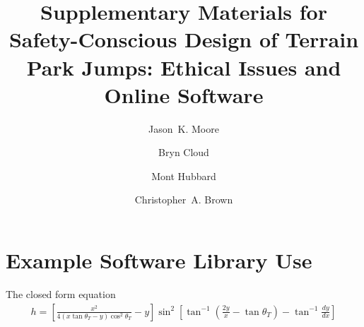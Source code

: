 \documentclass[]{article}
\begin{document}
\title{Supplementary Materials for Safety-Conscious Design of Terrain Park
Jumps: Ethical Issues and Online Software}

\author{
  Jason~K. Moore \and
  Bryn Cloud \and
  Mont Hubbard \and
  Christopher~A. Brown
}

\maketitle

\section{Example Software Library Use}
\label{sec:example}
%
The closed form equation
%
\begin{align}
  h = \left[\frac{x^2}{4(x\tan\theta_T - y)\cos^{2}\theta_T} - y\right]
    \sin^{2}
    \left[\tan^{-1}\left(\frac{2y}{x} - \tan\theta_T\right) -
    \tan^{-1}\frac{dy}{dx}\right]
  \label{eq:efh}
\end{align}
\end{document}
